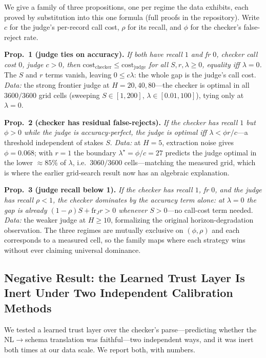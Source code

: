 \documentclass[letterpaper]{article}
\begin{document}
We give a family of three propositions, one per regime the data exhibits,
each proved by substitution into this one formula (full proofs in the
repository). Write $c$ for the judge's per-record call cost, $\rho$ for its
recall, and $\phi$ for the checker's false-reject rate.

\textbf{Prop.~1 (judge ties on accuracy).} \emph{If both have recall $1$ and
fr $0$, checker call cost $0$, judge $c>0$, then
$\text{cost}_\text{checker}\le\text{cost}_\text{judge}$ for all
$S,r,\lambda\ge0$, equality iff $\lambda=0$.} The $S$ and $r$ terms vanish,
leaving $0\le c\lambda$: the whole gap is the judge's call cost. \emph{Data:}
the strong frontier judge at $H{=}20,40,80$---the checker is optimal in all
$3600/3600$ grid cells (sweeping $S\in[1,200]$, $\lambda\in[0.01,100]$),
tying only at $\lambda{=}0$.

\textbf{Prop.~2 (checker has residual false-rejects).} \emph{If the checker
has recall $1$ but $\phi>0$ while the judge is accuracy-perfect, the judge is
optimal iff $\lambda<\phi r/c$}---a threshold independent of stakes $S$.
\emph{Data:} at $H{=}5$, extraction noise gives $\phi{=}0.068$; with $r{=}1$
the boundary $\lambda^\star{=}\phi/c{=}27$ predicts the judge optimal in the
lower ${\approx}85\%$ of $\lambda$, i.e.\ $3060/3600$ cells---matching the
measured grid, which is where the earlier grid-search result now has an
algebraic explanation.

\textbf{Prop.~3 (judge recall below 1).} \emph{If the checker has recall $1$,
fr $0$, and the judge has recall $\rho<1$, the checker dominates by the
accuracy term alone: at $\lambda{=}0$ the gap is already
$(1{-}\rho)S+\text{fr}_J r>0$ whenever $S>0$}---no call-cost term needed.
\emph{Data:} the weaker judge at $H\ge10$, formalizing the original
horizon-degradation observation. The three regimes are mutually exclusive on
$(\phi,\rho)$ and each corresponds to a measured cell, so the family maps
where each strategy wins without ever claiming universal dominance.

\subsection{Negative Result: the Learned Trust Layer Is Inert Under Two
Independent Calibration Methods}
\label{sec:trustresult}

We tested a learned trust layer over the checker's parse---predicting
whether the NL$\to$schema translation was faithful---two independent ways,
and it was inert both times at our data scale. We report both, with numbers.
\end{document}
